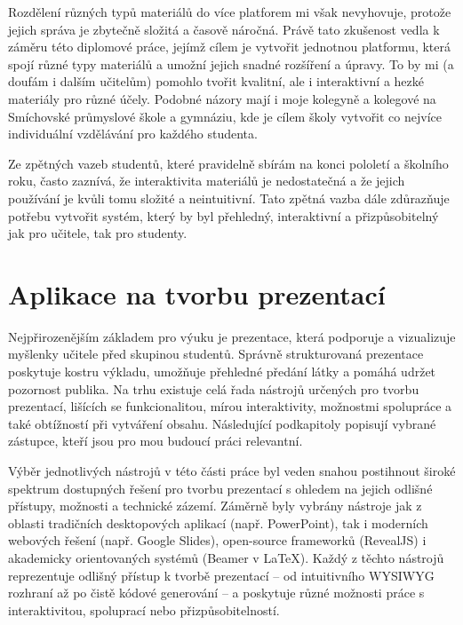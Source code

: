Rozdělení různých typů materiálů do více platforem mi však nevyhovuje, protože jejich správa je zbytečně složitá a časově náročná.
Právě tato zkušenost vedla k záměru této diplomové práce, jejímž cílem je vytvořit jednotnou platformu, která spojí různé typy materiálů a umožní jejich snadné rozšíření a úpravy.
To by mi (a doufám i dalším učitelům) pomohlo tvořit kvalitní, ale i interaktivní a hezké materiály pro různé účely.
Podobné názory mají i moje kolegyně a kolegové na Smíchovské průmyslové škole a gymnáziu, kde je cílem školy vytvořit co nejvíce individuální vzdělávání pro každého studenta.

Ze zpětných vazeb studentů, které pravidelně sbírám na konci pololetí a školního roku, často zaznívá, že interaktivita materiálů je nedostatečná a že jejich používání je kvůli tomu složité a neintuitivní.
Tato zpětná vazba dále zdůrazňuje potřebu vytvořit systém, který by byl přehledný, interaktivní a přizpůsobitelný jak pro učitele, tak pro studenty.



\section{Aplikace na tvorbu prezentací}\label{text:analyza/prezentace}

Nejpřirozenějším základem pro výuku je prezentace, která podporuje a vizualizuje myšlenky učitele před skupinou studentů.
Správně strukturovaná prezentace poskytuje kostru výkladu, umožňuje přehledné předání látky a pomáhá udržet pozornost publika.
Na trhu existuje celá řada nástrojů určených pro tvorbu prezentací, lišících se funkcionalitou, mírou interaktivity, možnostmi spolupráce a také obtížností při vytváření obsahu.
Následující podkapitoly popisují vybrané zástupce, kteří jsou pro mou budoucí práci relevantní.

Výběr jednotlivých nástrojů v této části práce byl veden snahou postihnout široké spektrum dostupných řešení pro tvorbu prezentací s ohledem na jejich odlišné přístupy, možnosti a technické zázemí. 
Záměrně byly vybrány nástroje jak z oblasti tradičních desktopových aplikací (např. PowerPoint), tak i moderních webových řešení (např. Google Slides), open-source frameworků (RevealJS) i akademicky orientovaných systémů (Beamer v \LaTeX). 
Každý z těchto nástrojů reprezentuje odlišný přístup k tvorbě prezentací -- od intuitivního WYSIWYG rozhraní až po čistě kódové generování -- a poskytuje různé možnosti práce s interaktivitou, spoluprací nebo přizpůsobitelností.

